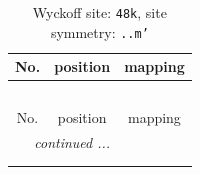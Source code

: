 \documentclass[fleqn,8pt]{jsarticle}
\begin{document}
\renewcommand{\arraystretch}{1.2}
\begin{longtable}{ccc}
\caption{Wyckoff site: {\tt 48k}, site symmetry: {\tt ..m'}}
 \\
 \hline \hline
No. & position & mapping \\ \hline \endfirsthead

\multicolumn{2}{l}{\tablename\ \thetable{}} \\
 \hline \hline
No. & position & mapping \\ \hline \endhead

 \hline \hline
\multicolumn{2}{r}{\footnotesize\it continued ...} \\ \endfoot

 \hline \hline
\multicolumn{2}{r}{} \\ \endlastfoot


\end{longtable}
\end{document}
